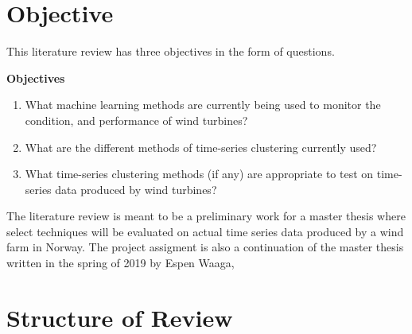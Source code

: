 \section{Objective} \label{sec:objective}
This literature review has three objectives in the form of questions. \bigskip

\begin{tcolorbox}
    \textbf{Objectives}

    \begin{enumerate}
        \item What machine learning methods are currently being used to monitor the condition, and performance of wind turbines?
        \item What are the different methods of time-series clustering currently used?
        \item What time-series clustering methods (if any) are appropriate to test on time-series data produced by wind turbines? 
    \end{enumerate}
\end{tcolorbox}
\bigskip

The literature review is meant to be a preliminary work for a master thesis where select techniques will be evaluated on actual time series data produced by a wind farm in Norway. The project assigment is also a continuation of the master thesis written in the spring of 2019 by Espen Waaga, 

\section{Structure of Review}
